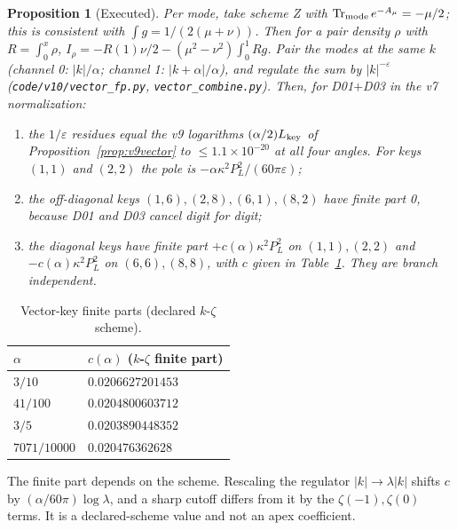 \documentclass[11pt,a4paper]{article}
\newcommand{\Tr}{\operatorname{Tr}}
\newcommand{\loc}[1]{\nolinkurl{#1}}
\theoremstyle{plain}
\newtheorem{proposition}[theorem]{Proposition}
\theoremstyle{definition}
\theoremstyle{remark}
\numberwithin{equation}{section}
\begin{document}
\begin{proposition}[Executed]
\label{prop:v10vector}
Per mode, take scheme Z with \(\Tr_{\rm mode}e^{-A_\mu}=-\mu/2\); this
is consistent with \(\int g=1/(2(\mu+\nu))\). Then for a pair density
\(\rho\) with \(R=\int_0^x\rho\),
\(I_\rho=-R(1)\nu/2-(\mu^2-\nu^2)\int_0^1Rg\). Pair the modes at
the same \(k\) (channel 0: \(|k|/\alpha\); channel 1:
\(|k+\alpha|/\alpha\)), and regulate the sum by \(|k|^{-\varepsilon}\)
(\loc{code/v10/vector_fp.py}, \loc{vector_combine.py}). Then, for
D01\(+\)D03 in the v7 normalization:
\begin{enumerate}[label=(\alph*)]
\item the \(1/\varepsilon\) residues equal the v9 logarithms
\((\alpha/2)L_{\rm key}\) of Proposition~\ref{prop:v9vector} to
\(\le1.1\times10^{-20}\) at all four angles. For keys \((1,1)\) and
\((2,2)\) the pole is \(-\alpha\kappa^2P_L^2/(60\pi\varepsilon)\);
\item the off-diagonal keys \((1,6),(2,8),(6,1),(8,2)\) have finite
part 0, because D01 and D03 cancel digit for digit;
\item the diagonal keys have finite part
\(+c(\alpha)\kappa^2P_L^2\) on \((1,1),(2,2)\) and
\(-c(\alpha)\kappa^2P_L^2\) on \((6,6),(8,8)\), with \(c\) given in
Table~\ref{tab:v10vec}. They are branch independent.
\end{enumerate}
\end{proposition}
\begin{table}[ht]\centering\small
\caption{Vector-key finite parts (declared \(k\)-\(\zeta\) scheme).}\label{tab:v10vec}
\begin{tabular}{@{}ll@{}}
\toprule
\(\alpha\) & \(c(\alpha)\) (\(k\)-\(\zeta\) finite part)\\
\midrule
\(3/10\) & \(0.0206627201453\)\\
\(41/100\) & \(0.0204800603712\)\\
\(3/5\) & \(0.0203890448352\)\\
\(7071/10000\) & \(0.020476362628\)\\
\bottomrule
\end{tabular}
\end{table}
The finite part depends on the scheme. Rescaling the regulator
\(|k|\to\lambda|k|\) shifts \(c\) by
\((\alpha/60\pi)\log\lambda\), and a sharp cutoff differs from it
by the \(\zeta(-1),\zeta(0)\) terms. It is a declared-scheme value
and not an apex coefficient.

\end{document}
